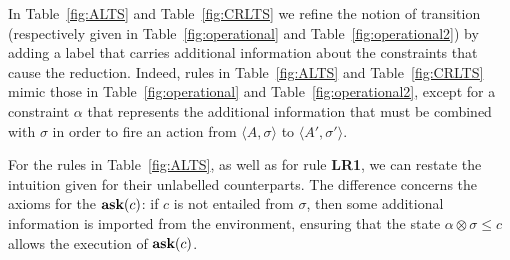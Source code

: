 \documentclass{llncs}
\def\1{{\mathbf 1}}
\newcommand{\comment}[1]{}
\newcommand{\ask}{{\bf ask}}
\newcommand{\ostop}{{\bf stop}}
\newcommand{\rarrow}{\rightarrow}
\def\1{{\mathbf 1}}
\begin{document}

In Table~\ref{fig:ALTS} and Table~\ref{fig:CRLTS} we refine the notion of transition (respectively given in Table~\ref{fig:operational} and Table~\ref{fig:operational2})
by adding a label that carries additional information about the constraints that cause the reduction.
Indeed, rules in Table~\ref{fig:ALTS} and Table~\ref{fig:CRLTS} mimic those in Table~\ref{fig:operational} and Table~\ref{fig:operational2}, except for a constraint $\alpha$ that
represents the additional information that must be combined with $\sigma$ in order to fire an action
from $\langle A, \sigma\rangle$  to $\langle A', \sigma' \rangle$.

For the rules in Table~\ref{fig:ALTS}, as well as for rule {\bf  LR1}, we can restate the intuition given for their unlabelled counterparts. 
The difference concerns the axioms for the $\hbox{\ask}(c)$: if $c$ is not entailed from $\sigma$, then
some additional information  is imported from the environment, ensuring that the state
$\alpha \otimes \sigma \leq c$ allows the execution of $\hbox{\ask}(c)$.
\comment{The requirement $\alpha \leq \1$ ensures that the received information strengthens the store, 
i.e., $\alpha \otimes \sigma \leq \sigma$.
\todo{$\alpha \leq \1$ si pu\`o rimuovere}}
\end{document}
